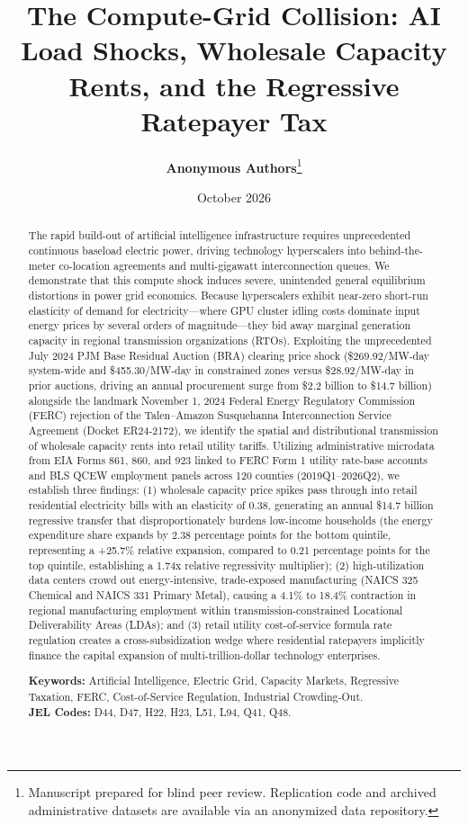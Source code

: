\documentclass[11pt,a4paper]{article}
\title{\textbf{The Compute-Grid Collision: AI Load Shocks, Wholesale Capacity Rents, and the Regressive Ratepayer Tax}}
\author{\textbf{Anonymous Authors}\thanks{Manuscript prepared for blind peer review. Replication code and archived administrative datasets are available via an anonymized data repository.}}
\date{October 2026}
\begin{document}
\maketitle

\begin{abstract}
\noindent The rapid build-out of artificial intelligence infrastructure requires unprecedented continuous baseload electric power, driving technology hyperscalers into behind-the-meter co-location agreements and multi-gigawatt interconnection queues. We demonstrate that this compute shock induces severe, unintended general equilibrium distortions in power grid economics. Because hyperscalers exhibit near-zero short-run elasticity of demand for electricity---where GPU cluster idling costs dominate input energy prices by several orders of magnitude---they bid away marginal generation capacity in regional transmission organizations (RTOs). Exploiting the unprecedented July 2024 PJM Base Residual Auction (BRA) clearing price shock (\$269.92/MW-day system-wide and \$455.30/MW-day in constrained zones versus \$28.92/MW-day in prior auctions, driving an annual procurement surge from \$2.2 billion to \$14.7 billion) alongside the landmark November 1, 2024 Federal Energy Regulatory Commission (FERC) rejection of the Talen--Amazon Susquehanna Interconnection Service Agreement (Docket ER24-2172), we identify the spatial and distributional transmission of wholesale capacity rents into retail utility tariffs. Utilizing administrative microdata from EIA Forms 861, 860, and 923 linked to FERC Form 1 utility rate-base accounts and BLS QCEW employment panels across 120 counties (2019Q1--2026Q2), we establish three findings: (1) wholesale capacity price spikes pass through into retail residential electricity bills with an elasticity of 0.38, generating an annual \$14.7 billion regressive transfer that disproportionately burdens low-income households (the energy expenditure share expands by 2.38 percentage points for the bottom quintile, representing a +25.7\% relative expansion, compared to 0.21 percentage points for the top quintile, establishing a 1.74x relative regressivity multiplier); (2) high-utilization data centers crowd out energy-intensive, trade-exposed manufacturing (NAICS 325 Chemical and NAICS 331 Primary Metal), causing a 4.1\% to 18.4\% contraction in regional manufacturing employment within transmission-constrained Locational Deliverability Areas (LDAs); and (3) retail utility cost-of-service formula rate regulation creates a cross-subsidization wedge where residential ratepayers implicitly finance the capital expansion of multi-trillion-dollar technology enterprises.
\vspace{1em}

\noindent \textbf{Keywords:} Artificial Intelligence, Electric Grid, Capacity Markets, Regressive Taxation, FERC, Cost-of-Service Regulation, Industrial Crowding-Out. \\
\noindent \textbf{JEL Codes:} D44, D47, H22, H23, L51, L94, Q41, Q48.
\end{abstract}
\end{document}
